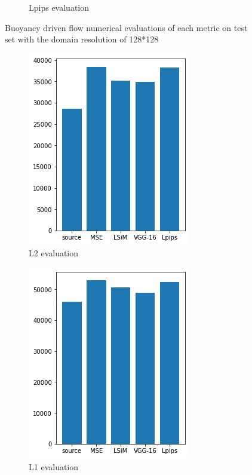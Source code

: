 \documentclass[a4paper,12pt,twoside]{report}
\begin{document}
\begin{figure}
\begin{subfigure}{0.32\textwidth}
		\caption{Lpips evaluation}
	\end{subfigure}
	\caption{Buoyancy driven flow numerical evaluations of each metric on test set with the domain resolution of 128*128}
	\label{sol buoyancy high numeval}
		\end{figure}
	
	
	
	
	\begin{figure}
		\centering
		\begin{subfigure}{0.32\textwidth}
			\centering
			\includegraphics[scale=0.49]{buoyancy_low/l2.png}
			\caption{L2 evaluation}
		\end{subfigure}
		\begin{subfigure}{0.32\textwidth}
			\centering
			\includegraphics[scale=0.49]{buoyancy_low/l1.png}
			\caption{L1 evaluation}
		\end{subfigure}
		\begin{subfigure}{0.32\textwidth}
			\centering

\end{subfigure}
\end{figure}
\end{document}
